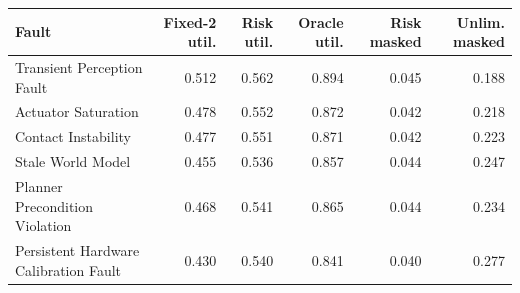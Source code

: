 \begin{tabular}{lrrrrr}
\toprule
Fault & Fixed-2 util. & Risk util. & Oracle util. & Risk masked & Unlim. masked \\
\midrule
Transient Perception Fault & 0.512 & 0.562 & 0.894 & 0.045 & 0.188 \\
Actuator Saturation & 0.478 & 0.552 & 0.872 & 0.042 & 0.218 \\
Contact Instability & 0.477 & 0.551 & 0.871 & 0.042 & 0.223 \\
Stale World Model & 0.455 & 0.536 & 0.857 & 0.044 & 0.247 \\
Planner Precondition Violation & 0.468 & 0.541 & 0.865 & 0.044 & 0.234 \\
Persistent Hardware Calibration Fault & 0.430 & 0.540 & 0.841 & 0.040 & 0.277 \\
\bottomrule
\end{tabular}
